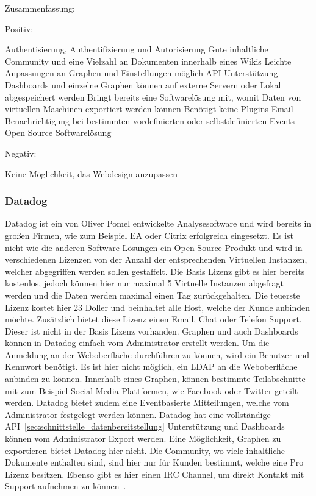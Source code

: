 Zusammenfassung:

Positiv:

\begin{outline}
  \1 Authentisierung, Authentifizierung und Autorisierung
  \1 Gute inhaltliche Community und eine Vielzahl an Dokumenten innerhalb
  eines Wikis
  \1 Leichte Anpassungen an Graphen und Einstellungen möglich
  \1 API Unterstützung
  \1 Dashboards und einzelne Graphen können auf externe Servern oder Lokal
  abgespeichert werden
  \1 Bringt bereits eine Softwarelösung mit, womit Daten von virtuellen
  Maschinen exportiert werden können
  \1 Benötigt keine Plugins
  \1 Email Benachrichtigung bei bestimmten vordefinierten oder selbstdefinierten
  Events
  \1 Open Source Softwarelösung
\end{outline}

Negativ:

\begin{outline}
  \1 Keine Möglichkeit, das Webdesign anzupassen
\end{outline}

\subsubsection{Datadog}
\label{subsubsec:datadog}
Datadog ist ein von Oliver Pomel entwickelte Analysesoftware und wird bereits
in großen Firmen, wie zum Beispiel EA oder Citrix erfolgreich eingesetzt. Es
ist nicht wie die anderen Software Lösungen ein Open Source Produkt und wird in
verschiedenen Lizenzen von der Anzahl der entsprechenden Virtuellen Instanzen,
welcher abgegriffen werden sollen gestaffelt. Die Basis Lizenz gibt es hier
bereits kostenlos, jedoch können hier nur maximal 5 Virtuelle Instanzen
abgefragt werden und die Daten werden maximal einen Tag zurückgehalten. Die
teuerste Lizenz kostet hier 23 Doller und beinhaltet alle Host, welche der
Kunde anbinden möchte. Zusätzlich bietet diese Lizenz einen Email, Chat oder
Telefon Support. Dieser ist nicht in der Basis Lizenz vorhanden. Graphen und
auch Dashboards können in Datadog einfach vom Administrator erstellt werden. Um
die Anmeldung an der Weboberfläche durchführen zu können, wird ein Benutzer und
Kennwort benötigt. Es ist hier nicht möglich, ein LDAP an die Weboberfläche
anbinden zu können. Innerhalb eines Graphen, können bestimmte Teilabschnitte
mit zum Beispiel Social Media Plattformen, wie Facebook oder Twitter geteilt
werden. Datadog bietet zudem eine Eventbasierte Mitteilungen, welche vom
Administrator festgelegt werden können. Datadog hat eine vollständige
API~\ref{sec:schnittstelle_datenbereitstellung} Unterstützung und Dashboards
können vom Administrator Export werden. Eine Möglichkeit, Graphen zu
exportieren bietet Datadog hier nicht. Die Community, wo viele inhaltliche
Dokumente enthalten sind, sind hier nur für Kunden bestimmt, welche eine Pro
Lizenz besitzen. Ebenso gibt es hier einen \gls{IRC Channel}, um direkt Kontakt
mit Support aufnehmen zu können~\cite{datadog}.

